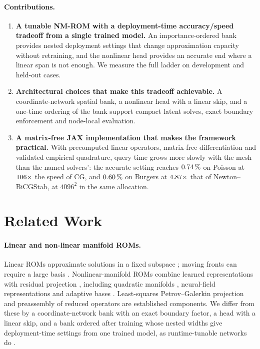 \documentclass{article}
\begin{document}
\paragraph{Contributions.}
\begin{enumerate}
\item \textbf{A tunable NM-ROM with a deployment-time accuracy/speed
tradeoff from a single trained model.}
An importance-ordered bank provides nested deployment settings that
change approximation capacity without retraining, and the nonlinear head
provides an accurate end where a linear span is not enough. We measure
the full ladder on development and held-out cases.
\item \textbf{Architectural choices that make this tradeoff achievable.}
A coordinate-network spatial bank, a nonlinear head with a linear skip,
and a one-time ordering of the bank support compact latent solves, exact
boundary enforcement and node-local evaluation.
\item \textbf{A matrix-free JAX implementation that makes the framework
practical.} With precomputed linear operators, matrix-free
differentiation and validated empirical quadrature, query time grows
more slowly with the mesh than the named solvers': the accurate setting reaches
$0.74\,\%$ on Poisson at
$106\times$ the speed of CG, and
$0.60\,\%$ on Burgers at
$4.87\times$ that of Newton--BiCGStab, at $4096^2$
in the same allocation.
\end{enumerate}

\section{Related Work}\label{sec:related}

\paragraph{Linear and non-linear manifold ROMs.}
Linear ROMs approximate solutions in a fixed subspace
\citep{BennerGugercinWillcox2015,Sirovich1987POD}; moving fronts can
require a large basis \citep{CohenDeVore2015,GreifUrban2019}.
Nonlinear-manifold ROMs combine learned representations with residual
projection \citep{LeeCarlberg2020,KimChoi2022NMROM}, including quadratic
manifolds \citep{GeelenWrightWillcox2022,BarnettFarhat2022}, neural-field
representations \citep{KimWenLeeChoiCNFROM2024} and adaptive bases
\citep{PeherstorferWillcox2015Adaptive,Carlberg2015hRefinement}.
Least-squares Petrov--Galerkin projection
\citep{Carlberg2011LSPG} and preassembly of reduced operators
\citep{StefanescuSandu2014,WederSchwerdtnerPeherstorfer2024} are established
components. We differ from these by a coordinate-network bank with an
exact boundary factor, a head with a linear skip, and a bank ordered
after training whose nested widths give deployment-time settings from one
trained model, as runtime-tunable networks do
\citep{YuSlimmable2019,Cai2020OnceForAll}.
\end{document}
